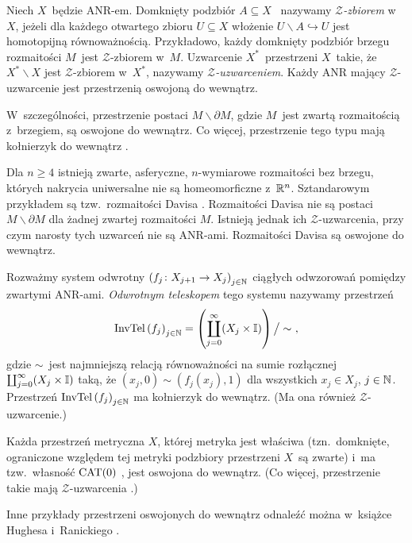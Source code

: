 \begin{ex}\label{przyklady-oswojonych-do-wewnatrz}\noindent
\begin{compactenum}
\item Niech $X$~będzie ANR-em. Domknięty podzbiór $A\subseteq X$~ nazywamy \mbox{\textit{$\mathcal{Z}$-zbiorem}} w~$X$, jeżeli dla każdego otwartego zbioru $U\subseteq X$ włożenie $U\smallsetminus A\hookrightarrow U$ jest homotopijną równoważnością. Przykładowo, każdy domknięty podzbiór brzegu rozmaitości $M$~jest $\mathcal{Z}$-zbiorem w~$M$. Uzwarcenie $X^*$~przestrzeni $X$~takie, że $X^*\smallsetminus X$ jest $\mathcal{Z}$-zbiorem w~$X^*$, nazywamy \textit{\mbox{$\mathcal{Z}$-uzwarceniem}}. Każdy ANR mający $\mathcal{Z}$-uzwarcenie jest przestrzenią oswojoną do wewnątrz.
\item W~szczególności, przestrzenie postaci $M\smallsetminus \partial M$, gdzie $M$~jest zwartą rozmaitością z~brzegiem, są oswojone do wewnątrz. Co więcej, przestrzenie tego typu mają kołnierzyk do wewnątrz \cite[Example 8.3]{Hughes96}.
\item Dla $n\geq 4$ istnieją zwarte, asferyczne, $n$-wymiarowe rozmaitości bez brzegu, których nakrycia uniwersalne nie są homeomorficzne z~$\mathbb{R}^n$. Sztandarowym przykładem są tzw.~rozmaitości Davisa \cite{Guilbault13}. Rozmaitości Davisa nie są postaci $M\smallsetminus \partial M$ dla żadnej zwartej rozmaitości $M$. Istnieją jednak ich \mbox{$\mathcal{Z}$-uzwarcenia}, przy czym narosty tych uzwarceń nie są ANR-ami. Rozmaitości Davisa są oswojone do wewnątrz.
\item Rozważmy system odwrotny $\left(f_j\colon X_{j+1}\to X_j\right)_{j\in\mathbb{N}}$ ciągłych odwzorowań pomiędzy zwartymi ANR-ami. \textit{Odwrotnym teleskopem} tego systemu nazywamy przestrzeń \[\operatorname{InvTel}\left(f_j\right)_{j\in\mathbb{N}}=\left(\coprod_{j=0}^{\infty}(X_j\times \mathbb{I})\right)\big/\sim\ ,\]
gdzie $\sim$~jest najmniejszą relacją równoważności na sumie rozłącznej $\coprod_{j=0}^{\infty}(X_j\times \mathbb{I})$ taką, że $(x_j,0)\sim (f_j(x_j),1)$ dla wszystkich $x_j\in X_j$, $j\in\mathbb{N}$. Przestrzeń $\operatorname{InvTel}\left(f_j\right)_{j\in\mathbb{N}}$ ma kołnierzyk do wewnątrz. (Ma ona również \mbox{$\mathcal{Z}$-uzwarcenie}.)
\item Każda przestrzeń metryczna $X$, której metryka jest właściwa (tzn.~domknięte, ograniczone względem tej metryki podzbiory przestrzeni $X$~są zwarte) i~ma tzw.~własność $\mathrm{CAT}(0)$ \cite{Bridson99}, jest oswojona do wewnątrz. (Co więcej, przestrzenie takie mają \mbox{$\mathcal{Z}$-uzwarcenia} \cite[Example 17.5.5]{Geoghegan08}.)
\item Inne przykłady przestrzeni oswojonych do wewnątrz odnaleźć można w~książce Hughesa i~Ranickiego \cite{Hughes96}.
\end{compactenum}
\end{ex}


